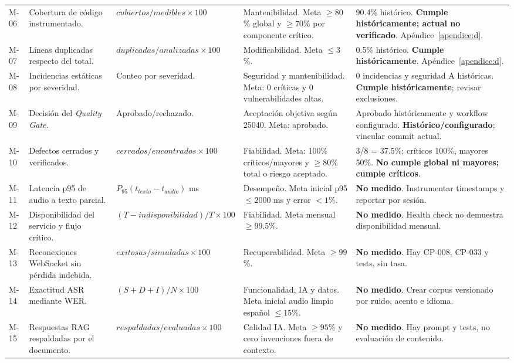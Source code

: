 \begin{landscape}
\begin{longtable}{p{1cm}p{4.2cm}p{3.6cm}p{4.5cm}p{7.5cm}}
M-06 & Cobertura de código instrumentado. & $cubiertos/medibles\times100$ & Mantenibilidad. Meta $\geq80$\% global y $\geq70$\% por componente crítico. & 90.4\% histórico. \textbf{Cumple históricamente; actual no verificado}. Apéndice~\ref{apendice:d}.\\
M-07 & Líneas duplicadas respecto del total. & $duplicadas/analizadas\times100$ & Modificabilidad. Meta $\leq3$\%. & 0.5\% histórico. \textbf{Cumple históricamente}. Apéndice~\ref{apendice:d}.\\
M-08 & Incidencias estáticas por severidad. & Conteo por severidad. & Seguridad y mantenibilidad. Meta: 0 críticas y 0 vulnerabilidades altas. & 0 incidencias y seguridad A históricas. \textbf{Cumple históricamente}; revisar exclusiones.\\
M-09 & Decisión del \textit{Quality Gate}. & Aprobado/rechazado. & Aceptación objetiva según 25040. Meta: aprobado. & Aprobado históricamente y workflow configurado. \textbf{Histórico/configurado}; vincular commit actual.\\
M-10 & Defectos cerrados y verificados. & $cerrados/encontrados\times100$ & Fiabilidad. Meta: 100\% críticos/mayores y $\geq80$\% total o riesgo aceptado. & 3/8 = 37.5\%; críticos 100\%, mayores 50\%. \textbf{No cumple global ni mayores; cumple críticos}.\\
M-11 & Latencia p95 de audio a texto parcial. & $P_{95}(t_{texto}-t_{audio})$ ms & Desempeño. Meta inicial p95 $\leq2000$ ms y error $<1$\%. & \textbf{No medido}. Instrumentar timestamps y reportar por sesión.\\
M-12 & Disponibilidad del servicio y flujo crítico. & $(T-indisponibilidad)/T\times100$ & Fiabilidad. Meta mensual $\geq99.5$\%. & \textbf{No medido}. Health check no demuestra disponibilidad mensual.\\
M-13 & Reconexiones WebSocket sin pérdida indebida. & $exitosas/simuladas\times100$ & Recuperabilidad. Meta $\geq99$\%. & \textbf{No medido}. Hay CP-008, CP-033 y tests, sin tasa.\\
M-14 & Exactitud ASR mediante WER. & $(S+D+I)/N\times100$ & Funcionalidad, IA y datos. Meta inicial audio limpio español $\leq15$\%. & \textbf{No medido}. Crear corpus versionado por ruido, acento e idioma.\\
M-15 & Respuestas RAG respaldadas por el documento. & $respaldadas/evaluadas\times100$ & Calidad IA. Meta $\geq95$\% y cero invenciones fuera de contexto. & \textbf{No medido}. Hay prompt y tests, no evaluación de contenido.\\

\end{longtable}
\end{landscape}

